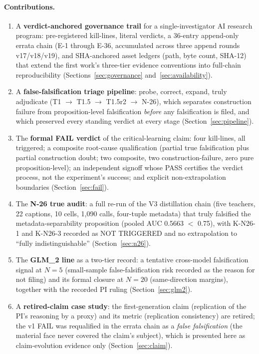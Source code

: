 \documentclass[11pt]{article}
\begin{document}
\paragraph{Contributions.}
\begin{enumerate}[label=(\roman*),leftmargin=2em]
\item A \textbf{verdict-anchored governance trail} for a single-investigator AI research program: pre-registered kill-lines, literal verdicts, a 36-entry append-only errata chain (E-1 through E-36, accumulated across three append rounds v17/v18/v19), and SHA-anchored asset ledgers (path, byte count, SHA-12) that extend the first work's three-tier evidence conventions into full-chain reproducibility (Sections~\ref{sec:governance} and~\ref{sec:availability}).
\item A \textbf{false-falsification triage pipeline}: probe, correct, expand, truly adjudicate (T1 $\rightarrow$ T1.5 $\rightarrow$ T1.5r2 $\rightarrow$ N-26), which separates construction failure from proposition-level falsification \emph{before} any falsification is filed, and which preserved every standing verdict at every stage (Section~\ref{sec:pipeline}).
\item The \textbf{formal FAIL verdict} of the critical-learning claim: four kill-lines, all triggered; a composite root-cause qualification (partial true falsification plus partial construction doubt; two composite, two construction-failure, zero pure proposition-level); an independent signoff whose PASS certifies the verdict process, not the experiment's success; and explicit non-extrapolation boundaries (Section~\ref{sec:fail}).
\item The \textbf{N-26 true audit}: a full re-run of the V3 distillation chain (five teachers, 22 captions, 10 cells, 1,090 calls, four-tuple metadata) that truly falsified the metadata-separability proposition (pooled AUC 0.5663 $<$ 0.75), with K-N26-1 and K-N26-3 recorded as NOT TRIGGERED and no extrapolation to ``fully indistinguishable'' (Section~\ref{sec:n26}).
\item The \textbf{GLM\_2 line} as a two-tier record: a tentative cross-model falsification signal at $N{=}5$ (small-sample false-falsification risk recorded as the reason for not filing) and its formal closure at $N{=}20$ (same-direction margins), together with the recorded PI ruling (Section~\ref{sec:glm2}).
\item A \textbf{retired-claim case study}: the first-generation claim (replication of the PI's reasoning by a proxy) and its metric (replication consistency) are retired; the v1 FAIL was requalified in the errata chain as a \emph{false falsification} (the material face never covered the claim's subject), which is presented here as claim-evolution evidence only (Section~\ref{sec:claim}).
\end{enumerate}
\end{document}

